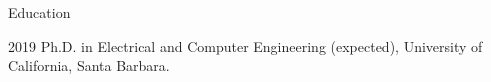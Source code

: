 \clearpage
{}
\begin{vitae}
\begin{vitaesection}{Education}
\vspace{-0.1cm}
\item [2019]	Ph.D. in Electrical and Computer Engineering (expected), University of California, Santa Barbara.
\end{vitaesection}







\end{vitae}
